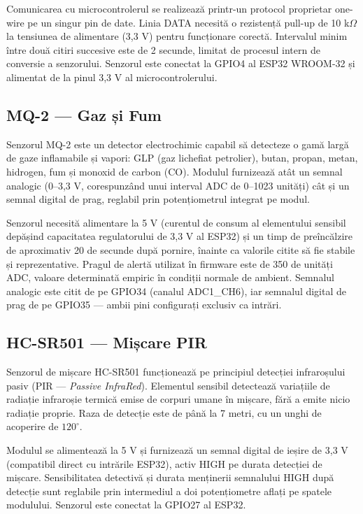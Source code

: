 \documentclass[12pt, twoside, a4paper]{report}
\begin{document}
Comunicarea cu microcontrolerul se realizează printr-un protocol proprietar one-wire
pe un singur pin de date. Linia DATA necesită o rezistență pull-up de 10 k$\Omega$ la
tensiunea de alimentare (3,3 V) pentru funcționare corectă. Intervalul minim între două
citiri succesive este de 2 secunde, limitat de procesul intern de conversie a senzorului.
Senzorul este conectat la GPIO4 al ESP32 WROOM-32 și alimentat de la pinul 3,3 V al
microcontrolerului.

\subsection{MQ-2 --- Gaz și Fum}

Senzorul MQ-2 este un detector electrochimic capabil să detecteze o gamă largă de gaze
inflamabile și vapori: GLP (gaz lichefiat petrolier), butan, propan, metan, hidrogen,
fum și monoxid de carbon (CO). Modulul furnizează atât un semnal analogic (0--3,3 V,
corespunzând unui interval ADC de 0--1023 unități) cât și un semnal digital de prag,
reglabil prin potențiometrul integrat pe modul.

Senzorul necesită alimentare la 5 V (curentul de consum al elementului sensibil
depășind capacitatea regulatorului de 3,3 V al ESP32) și un timp de preîncălzire de
aproximativ 20 de secunde după pornire, înainte ca valorile citite să fie stabile și
reprezentative. Pragul de alertă utilizat în firmware este de 350 de unități ADC,
valoare determinată empiric în condiții normale de ambient. Semnalul analogic este citit
de pe GPIO34 (canalul ADC1\_CH6), iar semnalul digital de prag de pe GPIO35 --- ambii
pini configurați exclusiv ca intrări.

\subsection{HC-SR501 --- Mișcare PIR}

Senzorul de mișcare HC-SR501 funcționează pe principiul detecției infraroșului pasiv
(PIR --- \textit{Passive InfraRed}). Elementul sensibil detectează variațiile de radiație
infraroșie termică emise de corpuri umane în mișcare, fără a emite nicio radiație proprie.
Raza de detecție este de până la 7 metri, cu un unghi de acoperire de $120^{\circ}$.

Modulul se alimentează la 5 V și furnizează un semnal digital de ieșire de 3,3 V
(compatibil direct cu intrările ESP32), activ HIGH pe durata detecției de mișcare.
Sensibilitatea detectivă și durata menținerii semnalului HIGH după detecție sunt reglabile
prin intermediul a doi potențiometre aflați pe spatele modulului. Senzorul este conectat
la GPIO27 al ESP32.
\end{document}
